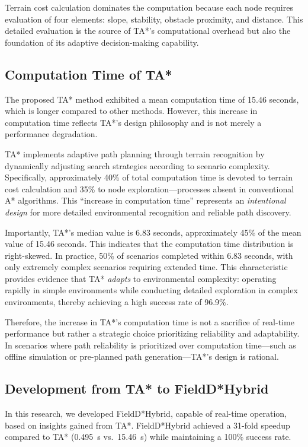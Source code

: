Terrain cost calculation dominates the computation because each node requires evaluation of four elements: slope, stability, obstacle proximity, and distance. This detailed evaluation is the source of TA*'s computational overhead but also the foundation of its adaptive decision-making capability.

\subsection{Computation Time of TA*}

The proposed TA* method exhibited a mean computation time of 15.46 seconds, which is longer compared to other methods. However, this increase in computation time reflects TA*'s design philosophy and is not merely a performance degradation.

TA* implements adaptive path planning through terrain recognition by dynamically adjusting search strategies according to scenario complexity. Specifically, approximately 40\% of total computation time is devoted to terrain cost calculation and 35\% to node exploration---processes absent in conventional A* algorithms. This ``increase in computation time'' represents an \textit{intentional design} for more detailed environmental recognition and reliable path discovery.

Importantly, TA*'s median value is 6.83 seconds, approximately 45\% of the mean value of 15.46 seconds. This indicates that the computation time distribution is right-skewed. In practice, 50\% of scenarios completed within 6.83 seconds, with only extremely complex scenarios requiring extended time. This characteristic provides evidence that TA* \textit{adapts} to environmental complexity: operating rapidly in simple environments while conducting detailed exploration in complex environments, thereby achieving a high success rate of 96.9\%.

Therefore, the increase in TA*'s computation time is not a sacrifice of real-time performance but rather a strategic choice prioritizing reliability and adaptability. In scenarios where path reliability is prioritized over computation time---such as offline simulation or pre-planned path generation---TA*'s design is rational.

\subsection{Development from TA* to FieldD*Hybrid}

In this research, we developed FieldD*Hybrid, capable of real-time operation, based on insights gained from TA*. FieldD*Hybrid achieved a 31-fold speedup compared to TA* (0.495~s vs.\ 15.46~s) while maintaining a 100\% success rate.

